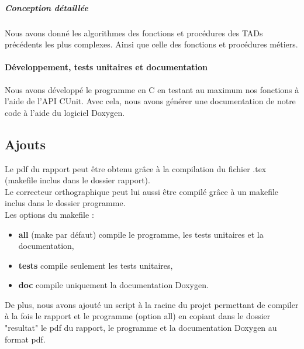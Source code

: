 \subparagraph{Conception détaillée}
Nous avons donné les algorithmes des fonctions et procédures des TADs précédents les plus complexes. Ainsi que celle des fonctions et procédures métiers.\\

\paragraph{Développement, tests unitaires et documentation}
Nous avons développé le programme en C en testant au maximum nos fonctions à l'aide de l'API CUnit. 
Avec cela, nous avons générer une documentation de notre code à l'aide du logiciel Doxygen.\\

\subsection{Ajouts}
Le pdf du rapport peut être obtenu grâce à la compilation du fichier .tex (makefile inclus dans le dossier rapport).\\
Le correcteur orthographique peut lui aussi être compilé grâce à un makefile inclus dans le dossier programme.\\
Les options du makefile :
\begin{itemize}
	\item \textbf{all} (make par défaut) compile le programme, les tests unitaires et la documentation,\\
	\item \textbf{tests} compile seulement les tests unitaires,\\
	\item \textbf{doc} compile uniquement la documentation Doxygen.\\
\end{itemize}
De plus, nous avons ajouté un script à la racine du projet permettant de compiler à la fois le rapport et le programme (option all) en copiant dans le dossier "resultat" le pdf du rapport, le programme et la documentation Doxygen au format pdf.\\
